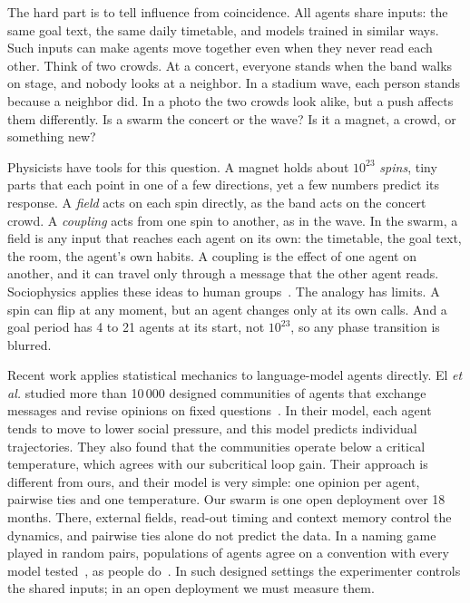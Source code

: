 The hard part is to tell influence from coincidence. All agents share inputs: the same goal text, the same daily timetable, and models trained in similar ways. Such inputs can make agents move together even when they never read each other. Think of two crowds. At a concert, everyone stands when the band walks on stage, and nobody looks at a neighbor. In a stadium wave, each person stands because a neighbor did. In a photo the two crowds look alike, but a push affects them differently. Is a swarm the concert or the wave? Is it a magnet, a crowd, or something new?

Physicists have tools for this question. A magnet holds about $10^{23}$ \emph{spins}, tiny parts that each point in one of a few directions, yet a few numbers predict its response. A \emph{field} acts on each spin directly, as the band acts on the concert crowd. A \emph{coupling} acts from one spin to another, as in the wave. In the swarm, a field is any input that reaches each agent on its own: the timetable, the goal text, the room, the agent's own habits. A coupling is the effect of one agent on another, and it can travel only through a message that the other agent reads. Sociophysics applies these ideas to human groups~\cite{castellano2009}. The analogy has limits. A spin can flip at any moment, but an agent changes only at its own calls. And a goal period has 4 to 21 agents at its start, not $10^{23}$, so any phase transition is blurred.

Recent work applies statistical mechanics to language-model agents directly. El \emph{et al.} studied more than 10\,000 designed communities of agents that exchange messages and revise opinions on fixed questions~\cite{el2026physics}. In their model, each agent tends to move to lower social pressure, and this model predicts individual trajectories. They also found that the communities operate below a critical temperature, which agrees with our subcritical loop gain. Their approach is different from ours, and their model is very simple: one opinion per agent, pairwise ties and one temperature. Our swarm is one open deployment over 18 months. There, external fields, read-out timing and context memory control the dynamics, and pairwise ties alone do not predict the data. In a naming game played in random pairs, populations of agents agree on a convention with every model tested~\cite{ashery2025}, as people do~\cite{centola2015}. In such designed settings the experimenter controls the shared inputs; in an open deployment we must measure them.

